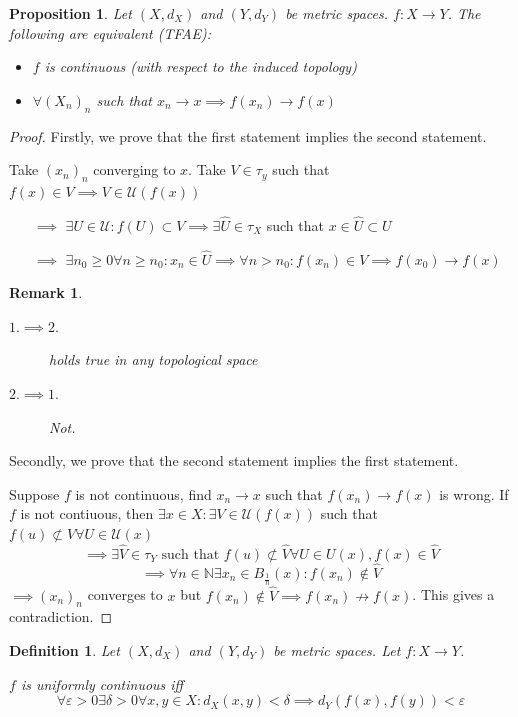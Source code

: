 \documentclass{article}
\newcounter{lecref}[section]
\numberwithin{lecref}{section}
\newtheorem{definition}[lecref]{Definition}
\newtheorem*{Remark}{Remark}
\newtheorem{proposition}[lecref]{Proposition}
\begin{document}
\begin{proposition}
	\label{proposition:1.15}
	Let $(X, d_X)$ and $(Y, d_Y)$ be metric spaces. $f: X \to Y$. The following are equivalent (TFAE):
	\begin{itemize}
		\item $f$ is continuous (with respect to the induced topology)
		\item $\forall (X_n)_n$ such that $x_n \to x \implies f(x_n) \to f(x)$
	\end{itemize}
\end{proposition}
\begin{proof}
	Firstly, we prove that the first statement implies the second statement.

	Take $(x_n)_n$ converging to $x$. Take $V \in \tau_y$ such that $f(x) \in V \implies V \in \mathcal U(f(x))$
	\begin{enumerate}
		\item[$\implies$] $\exists U \in \mathcal U: f(U) \subset V \implies \exists \hat U \in \tau_X$ such that $x \in \hat U \subset U$
		\item[$\implies$] $\exists n_0 \geq 0 \forall n \geq n_0: x_n \in \hat U \implies \forall n > n_0: f(x_n) \in V \implies f(x_0) \to f(x)$
	\end{enumerate}

	\begin{Remark}
		\begin{description}
			\item[$1. \implies 2.$] holds true in any topological space
			\item[$2. \implies 1.$] Not.
		\end{description}
	\end{Remark}

	Secondly, we prove that the second statement implies the first statement.

	Suppose $f$ is not continuous, find $x_n \to x$ such that $f(x_n) \to f(x)$ is wrong.
	If $f$ is not contiuous, then $\exists x \in X: \exists V \in \mathcal U(f(x))$ such that $f(u) \not\subset V \forall U \in \mathcal U(x)$
	\[ \implies \exists \hat V \in \tau_Y \text{ such that } f(u) \not\subset \hat V \forall U \in U(x), f(x) \in \hat V \]
	\[ \implies \forall n \in \mathbb N \exists x_n \in B_{\frac1n}(x): f(x_n) \not\in \hat V \]
	$\implies (x_n)_n$ converges to $x$ but $f(x_n) \not\in \hat V \implies f(x_n) \not\to f(x)$. This gives a contradiction.
\end{proof}

\begin{definition}
	\label{definition:1.16}
	Let $(X, d_X)$ and $(Y, d_Y)$ be metric spaces. Let $f: X \to Y$.

	$f$ is \emph{uniformly continuous} iff
	\[ \forall \varepsilon > 0 \exists \delta > 0 \forall x, y \in X: d_X(x, y) < \delta \implies d_Y(f(x), f(y)) < \varepsilon \]
\end{definition}
\end{document}
